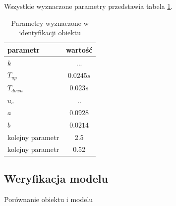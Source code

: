 Wszystkie wyznaczone parametry przedstawia tabela \ref{tab:parametry_ident}.

\begin{table}[H]
\begin{center}
  \begin{tabular}{| l | c | }
    \hline
    parametr 	& wartość \\ \hline
    $k$ & ... \\ \hline
    $T_{up}$ & $0.0245 s$  \\ \hline
	$T_{down}$ & $0.023 s$  \\ \hline
	$u_c$ & .. 	 \\ \hline
    $a$ 		  	& $0.0928$ \\ \hline
    $b$		  	& $0.0214$ \\ \hline
    kolejny parametr 			& 2.5 \\ \hline
    kolejny parametr 		& 0.52 \\
    \hline
  \end{tabular}
  \caption{Parametry wyznaczone w identyfikacji obiektu}
  \label{tab:parametry_ident}
\end{center}
\end{table}

\subsection{Weryfikacja modelu}

Porównanie obiektu i modelu 




